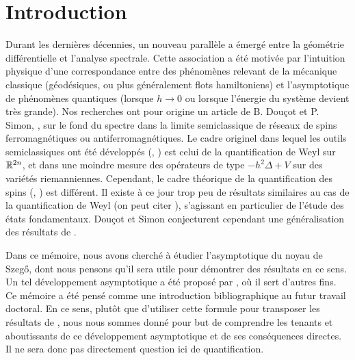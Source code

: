 \chapter*{Introduction}
Durant les dernières décennies, un nouveau parallèle a émergé entre la géométrie différentielle et l'analyse spectrale. Cette association a été motivée par l'intuition physique d'une correspondance entre des phénomènes relevant de la mécanique classique (géodésiques, ou plus généralement flots hamiltoniens) et l'asymptotique de phénomènes quantiques (lorsque $h \to 0$ ou lorsque l'énergie du système devient très grande). Nos recherches ont pour origine un article de B. Douçot et P. Simon, \cite{douccot1998semiclassical}, sur le fond du spectre dans la limite semiclassique de réseaux de spins ferromagnétiques ou antiferromagnétiques. Le cadre originel dans lequel les outils semiclassiques ont été développés (\cite{helffer1988semi},  \cite{zworski2012semiclassical}) est celui de la quantification de Weyl sur $\mathbb{R}^{2n}$, et dans une moindre mesure des opérateurs de type $-h^2\Delta + V$ sur des variétés riemanniennes. Cependant, le cadre théorique de la quantification des spins (\cite{ma2012berezin}, \cite{borthwick2000introduction}) est différent. Il existe à ce jour trop peu de résultats similaires au cas de la quantification de Weyl (on peut citer \cite{borthwick1998semiclassical}), s'agissant en particulier de l'étude des états fondamentaux. Douçot et Simon conjecturent cependant une généralisation des résultats de \cite{helffer1988semi}. 

Dans ce mémoire, nous avons cherché à étudier l'asymptotique du noyau de Szeg\H{o}, dont nous pensons qu'il sera utile pour démontrer des résultats en ce sens. Un tel développement asymptotique a été proposé par \cite{Shiffman2002}, où il sert d'autres fins. Ce mémoire a été pensé comme une introduction bibliographique au futur travail doctoral. En ce sens, plutôt que d'utiliser cette formule pour transposer les résultats de \cite{helffer1988semi}, nous nous sommes donné pour but de comprendre les tenants et aboutissants de ce développement asymptotique et de ses conséquences directes. Il ne sera donc pas directement question ici de quantification.

